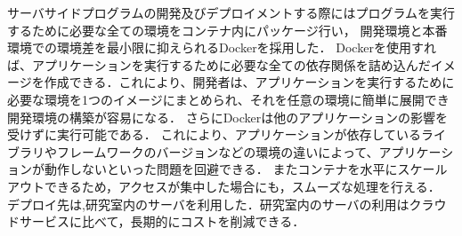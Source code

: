 サーバサイドプログラムの開発及びデプロイメントする際にはプログラムを実行するために必要な全ての環境をコンテナ内にパッケージ行い，
開発環境と本番環境での環境差を最小限に抑えられるDockerを採用した．
Dockerを使用すれば、アプリケーションを実行するために必要な全ての依存関係を詰め込んだイメージを作成できる．これにより、開発者は、アプリケーションを実行するために必要な環境を1つのイメージにまとめられ、それを任意の環境に簡単に展開でき開発環境の構築が容易になる．
さらにDockerは他のアプリケーションの影響を受けずに実行可能である．
これにより、アプリケーションが依存しているライブラリやフレームワークのバージョンなどの環境の違いによって、アプリケーションが動作しないといった問題を回避できる．
またコンテナを水平にスケールアウトできるため，アクセスが集中した場合にも，スムーズな処理を行える．
デプロイ先は,研究室内のサーバを利用した．研究室内のサーバの利用はクラウドサービスに比べて，長期的にコストを削減できる．





